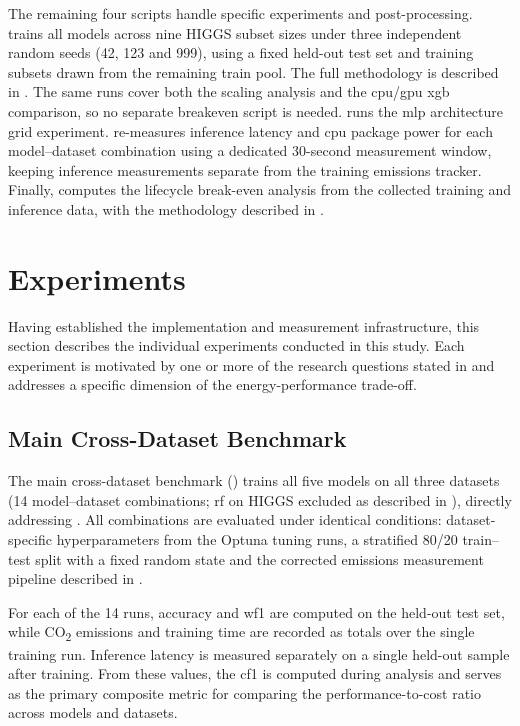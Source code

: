 The remaining four scripts handle specific experiments and post-processing.  trains all models across nine HIGGS subset sizes under three independent random seeds (42, 123 and 999), using a fixed held-out test set and training subsets drawn from the remaining train pool. The full methodology is described in . The same runs cover both the scaling analysis and the \gls{cpu}/\gls{gpu} \gls{xgb} comparison, so no separate breakeven script is needed.  runs the \gls{mlp} architecture grid experiment.  re-measures inference latency and \gls{cpu} package power for each model--dataset combination using a dedicated 30-second measurement window, keeping inference measurements separate from the training emissions tracker. Finally,  computes the lifecycle break-even analysis from the collected training and inference data, with the methodology described in .

\section{Experiments}
\label{sec:experiments}

Having established the implementation and measurement infrastructure, this section describes the individual experiments conducted in this study. Each experiment is motivated by one or more of the research questions stated in  and addresses a specific dimension of the energy-performance trade-off.

\subsection{Main Cross-Dataset Benchmark}
\label{design_main_benchmark}

The main cross-dataset benchmark () trains all five models on all three datasets (14 model--dataset combinations; \gls{rf} on HIGGS excluded as described in ), directly addressing . All combinations are evaluated under identical conditions: dataset-specific hyperparameters from the Optuna tuning runs, a stratified 80/20 train--test split with a fixed random state and the corrected emissions measurement pipeline described in .

For each of the 14 runs, accuracy and \gls{wf1} are computed on the held-out test set, while CO\textsubscript{2} emissions and training time are recorded as totals over the single training run. Inference latency is measured separately on a single held-out sample after training. From these values, the \gls{cf1} is computed during analysis and serves as the primary composite metric for comparing the performance-to-cost ratio across models and datasets.

